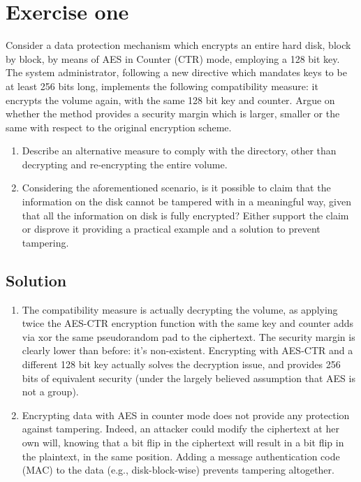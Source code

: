 \section{Exercise one}

Consider a data protection mechanism which encrypts an entire hard disk, block by block, by means of AES in Counter (CTR) mode, employing a 128 bit key.
The system administrator, following a new directive which mandates keys to be at least 256 bits long, implements the following compatibility measure: it encrypts the volume again, with the same 128 bit key and counter. 
Argue on whether the method provides a security margin which is larger, smaller or the same with respect to the original encryption scheme. 
\begin{enumerate}
    \item Describe an alternative measure to comply with the directory, other than decrypting and re-encrypting the entire volume.
    \item Considering the aforementioned scenario, is it possible to claim that the information on the disk cannot be tampered with in a meaningful way, given that all the information on disk is fully encrypted? 
        Either support the claim or disprove it providing a practical example and a solution to prevent tampering.
\end{enumerate}

\subsection*{Solution}
\begin{enumerate}
    \item The compatibility measure is actually decrypting the volume, as applying twice the AES-CTR encryption function with the same key and counter adds via xor the same pseudorandom pad to the ciphertext. 
        The security margin is clearly lower than before: it's non-existent.
        Encrypting with AES-CTR and a different 128 bit key actually solves the decryption issue, and provides 256 bits of equivalent security (under the largely believed assumption that AES is not a group).
    \item Encrypting data with AES in counter mode does not provide any protection against tampering. 
        Indeed, an attacker could modify the ciphertext at her own will, knowing that a bit flip in the ciphertext will result in a bit flip in the plaintext, in the same position. 
        Adding a message authentication code (MAC) to the data (e.g., disk-block-wise) prevents tampering altogether.
\end{enumerate}